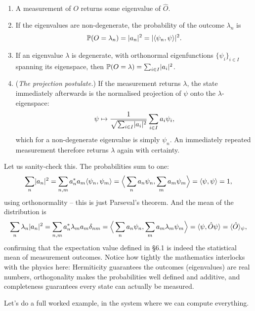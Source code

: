 \documentclass[a4paper]{scrartcl}
\newcommand{\inp}[2]{\langle #1, #2 \rangle}
\begin{document}
\begin{enumerate}[label=(\roman*)]
    \item A measurement of $O$ returns some eigenvalue of $\hat{O}$.
    \item If the eigenvalues are non-degenerate, the probability of the outcome $\lambda_n$ is
    $$
    \PP(O = \lambda_n) = \abs{a_n}^2 = \abs{\inp{\psi_n}{\psi}}^2.
    $$
    \item If an eigenvalue $\lambda$ is degenerate, with orthonormal eigenfunctions $\{\psi_i\}_{i \in I}$ spanning its eigenspace, then $\mathbb{P}(O = \lambda) = \sum_{i \in I} \lvert a_i\rvert^2$.
    \item (\emph{The projection postulate.}) If the measurement returns $\lambda$, the state immediately afterwards is the normalised projection of $\psi$ onto the $\lambda$-eigenspace:
    $$
    \psi \mapsto \frac{1}{\sqrt{\sum_{i \in I}\lvert a_i\rvert^2}}\sum_{i \in I} a_i \psi_i ,
    $$
    which for a non-degenerate eigenvalue is simply $\psi_n$. An immediately repeated measurement therefore returns $\lambda$ again with certainty.
\end{enumerate}

Let us sanity-check this. The probabilities sum to one:
$$
\sum_n \abs{a_n}^2 = \sum_{n,m} a_n^* a_m \inp{\psi_n}{\psi_m} = \Big\langle \sum_n a_n \psi_n, \sum_m a_m \psi_m \Big\rangle = \inp{\psi}{\psi} = 1,
$$
using orthonormality -- this is just Parseval's theorem. And the mean of the distribution is
$$
\sum_n \lambda_n \abs{a_n}^2 = \sum_{n, m} a_n^* \lambda_m a_m \delta_{nm} = \Big\langle \sum_n a_n \psi_n, \sum_m a_m \lambda_m \psi_m \Big\rangle = \inp{\psi}{\hat{O} \psi} = \langle \hat{O} \rangle_\psi,
$$
confirming that the expectation value defined in \S 6.1 is indeed the statistical mean of measurement outcomes. Notice how tightly the mathematics interlocks with the physics here: Hermiticity guarantees the outcomes (eigenvalues) are real numbers, orthogonality makes the probabilities well defined and additive, and completeness guarantees every state can actually be measured.

Let's do a full worked example, in the system where we can compute everything.
\end{document}
